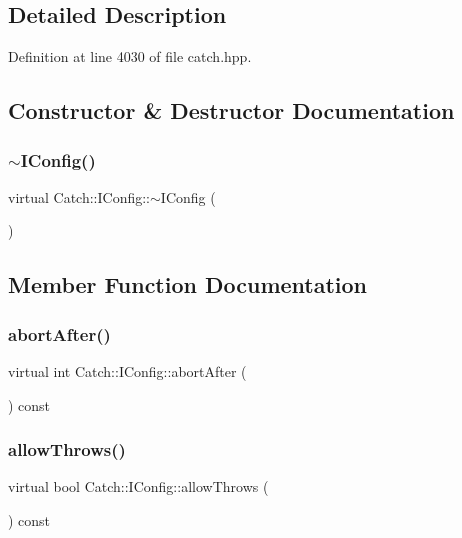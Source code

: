 \subsection{Detailed Description}


Definition at line 4030 of file catch.\+hpp.



\subsection{Constructor \& Destructor Documentation}
\mbox{\label{struct_catch_1_1_i_config_adadf7c57478e4b0c83bea5b38d2dbc87}} 
\subsubsection{$\sim$IConfig()}
{\footnotesize\ttfamily virtual Catch\+::\+I\+Config\+::$\sim$\+I\+Config (\begin{DoxyParamCaption}{ }\end{DoxyParamCaption})\hspace{0.3cm}{\ttfamily [virtual]}}



\subsection{Member Function Documentation}
\mbox{\label{struct_catch_1_1_i_config_a363f3388a439d02217f37198eff96744}} 
\subsubsection{abortAfter()}
{\footnotesize\ttfamily virtual int Catch\+::\+I\+Config\+::abort\+After (\begin{DoxyParamCaption}{ }\end{DoxyParamCaption}) const\hspace{0.3cm}{\ttfamily [pure virtual]}}

\mbox{\label{struct_catch_1_1_i_config_aadb95f849359de1e6eb915aab063e542}} 
\subsubsection{allowThrows()}
{\footnotesize\ttfamily virtual bool Catch\+::\+I\+Config\+::allow\+Throws (\begin{DoxyParamCaption}{ }\end{DoxyParamCaption}) const\hspace{0.3cm}{\ttfamily [pure virtual]}}

